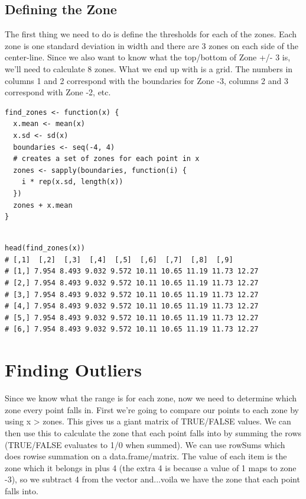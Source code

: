 \documentclass[a4paper,12pt]{article}
\begin{document}
\subsection{Defining the Zone}

The first thing we need to do is define the thresholds for each of the zones. Each zone is one standard deviation in width and there are 3 zones on each side of the center-line. Since we also want to know what the top/bottom of Zone +/- 3 is, we'll need to calculate 8 zones. What we end up with is a grid. The numbers in columns 1 and 2 correspond with the boundaries for Zone -3, columns 2 and 3 correspond with Zone -2, etc.
\begin{framed}
\begin{verbatim}
find_zones <- function(x) {
  x.mean <- mean(x)
  x.sd <- sd(x)
  boundaries <- seq(-4, 4)
  # creates a set of zones for each point in x
  zones <- sapply(boundaries, function(i) {
    i * rep(x.sd, length(x))
  })
  zones + x.mean
}
 
\end{verbatim}
\end{framed} 
\begin{verbatim}
head(find_zones(x))
# [,1]  [,2]  [,3]  [,4]  [,5]  [,6]  [,7]  [,8]  [,9]
# [1,] 7.954 8.493 9.032 9.572 10.11 10.65 11.19 11.73 12.27
# [2,] 7.954 8.493 9.032 9.572 10.11 10.65 11.19 11.73 12.27
# [3,] 7.954 8.493 9.032 9.572 10.11 10.65 11.19 11.73 12.27
# [4,] 7.954 8.493 9.032 9.572 10.11 10.65 11.19 11.73 12.27
# [5,] 7.954 8.493 9.032 9.572 10.11 10.65 11.19 11.73 12.27
# [6,] 7.954 8.493 9.032 9.572 10.11 10.65 11.19 11.73 12.27
\end{verbatim}
\newpage
\section{Finding Outliers}

Since we know what the range is for each zone, now we need to determine which zone every point falls in. First we're going to compare our points to each zone by using x > zones. This gives us a giant matrix of TRUE/FALSE values. We can then use this to calculate the zone that each point falls into by summing the rows (TRUE/FALSE evaluates to 1/0 when summed). We can use rowSums which does rowise summation on a data.frame/matrix. The value of each item is the zone which it belongs in plus 4 (the extra 4 is because a value of 1 maps to zone -3), so we subtract 4 from the vector and...voila we have the zone that each point falls into.
\end{document}
